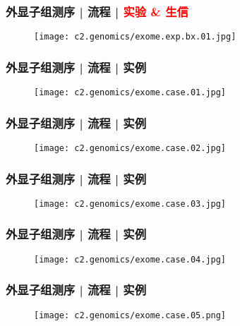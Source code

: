 \begin{frame}
  \frametitle{外显子组测序 | 流程 | \textcolor{red}{实验 \& 生信}}
  \begin{figure}
    \centering
    \texttt{[image: c2.genomics/exome.exp.bx.01.jpg]}
  \end{figure}
\end{frame}

\begin{frame}
  \frametitle{外显子组测序 | 流程 | 实例}
  \begin{figure}
    \centering
    \texttt{[image: c2.genomics/exome.case.01.jpg]}
  \end{figure}
\end{frame}

\begin{frame}
  \frametitle{外显子组测序 | 流程 | 实例}
  \begin{figure}
    \centering
    \texttt{[image: c2.genomics/exome.case.02.jpg]}
  \end{figure}
\end{frame}

\begin{frame}
  \frametitle{外显子组测序 | 流程 | 实例}
  \begin{figure}
    \centering
    \texttt{[image: c2.genomics/exome.case.03.jpg]}
  \end{figure}
\end{frame}

\begin{frame}
  \frametitle{外显子组测序 | 流程 | 实例}
  \begin{figure}
    \centering
    \texttt{[image: c2.genomics/exome.case.04.jpg]}
  \end{figure}
\end{frame}

\begin{frame}
  \frametitle{外显子组测序 | 流程 | 实例}
  \begin{figure}
    \centering
    \texttt{[image: c2.genomics/exome.case.05.png]}
  \end{figure}
\end{frame}


